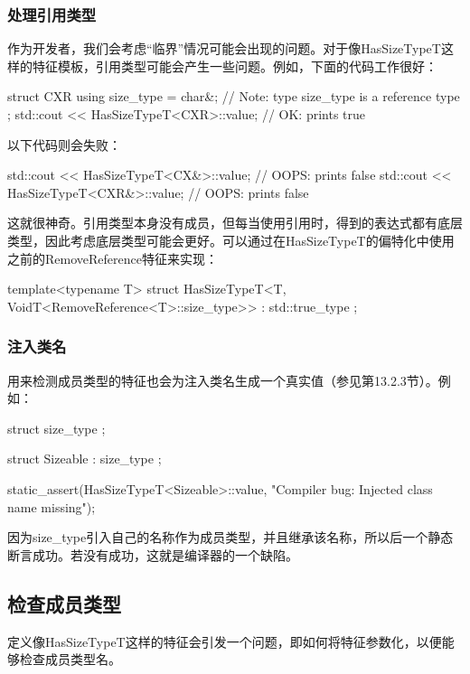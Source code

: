 \subsubsection{处理引用类型}

作为开发者，我们会考虑“临界”情况可能会出现的问题。对于像HasSizeTypeT这样的特征模板，引用类型可能会产生一些问题。例如，下面的代码工作很好：

\begin{cpp}
struct CXR {
	using size_type = char&; // Note: type size_type is a reference type
};
std::cout << HasSizeTypeT<CXR>::value; // OK: prints true
\end{cpp}

以下代码则会失败：

\begin{cpp}
std::cout << HasSizeTypeT<CX&>::value; // OOPS: prints false
std::cout << HasSizeTypeT<CXR&>::value; // OOPS: prints false
\end{cpp}

这就很神奇。引用类型本身没有成员，但每当使用引用时，得到的表达式都有底层类型，因此考虑底层类型可能会更好。可以通过在HasSizeTypeT的偏特化中使用之前的RemoveReference特征来实现：

\begin{cpp}
template<typename T>
struct HasSizeTypeT<T, VoidT<RemoveReference<T>::size_type>>
: std::true_type {
};
\end{cpp}

\subsubsection{注入类名}

用来检测成员类型的特征也会为注入类名生成一个真实值（参见第13.2.3节）。例如：

\begin{cpp}
struct size_type {
};

struct Sizeable : size_type {
};

static_assert(HasSizeTypeT<Sizeable>::value,
			"Compiler bug: Injected class name missing");
\end{cpp}

因为size\_type引入自己的名称作为成员类型，并且继承该名称，所以后一个静态断言成功。若没有成功，这就是编译器的一个缺陷。

\subsection{检查成员类型}

定义像HasSizeTypeT这样的特征会引发一个问题，即如何将特征参数化，以便能够检查成员类型名。

